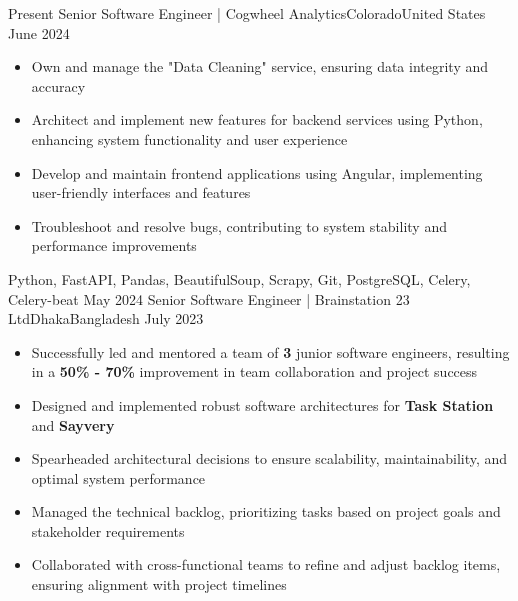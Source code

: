 %
%
%
\begin{experiences}
 \experience
    {Present}   {Senior Software Engineer | Cogwheel Analytics}{Colorado}{United States}
    {June 2024} {
                     \begin{itemize}
                       \item Own and manage the "Data Cleaning" service, ensuring data integrity and accuracy
                       \item Architect and implement new features for backend services using Python, enhancing system functionality and user experience
                       \item Develop and maintain frontend applications using Angular, implementing user-friendly interfaces and features
                        \item Troubleshoot and resolve bugs, contributing to system stability and performance improvements
                      \end{itemize}
                    }
                    {Python, FastAPI, Pandas, BeautifulSoup, Scrapy, Git, PostgreSQL, Celery, Celery-beat}
  \emptySeparator
 \experience
    {May 2024}   {Senior Software Engineer | Brainstation 23 Ltd}{Dhaka}{Bangladesh}
    {July 2023} {
                     \begin{itemize}
                       \item Successfully led and mentored a team of \textbf{3} junior software engineers, resulting in a \textbf{50\% - 70\%} improvement in team collaboration and project success
                       \item Designed and implemented robust software architectures for \textbf{Task Station} and \textbf{Sayvery}
                       \item Spearheaded architectural decisions to ensure scalability, maintainability, and optimal system performance
                        \item Managed the technical backlog, prioritizing tasks based on project goals and stakeholder requirements
                        \item Collaborated with cross-functional teams to refine and adjust backlog items, ensuring alignment with project timelines

\end{itemize}}
\end{experiences}
